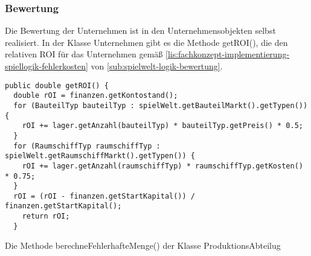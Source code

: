 \subsubsection{Bewertung}
\label{subsub:fachkonzept-implementierung-spiellogik-bewertung}

Die Bewertung der Unternehmen ist in den Unternehmensobjekten selbst realisiert. In der Klasse Unternehmen gibt es die Methode getROI(), die den relativen ROI für das Unternehmen gemäß \ref{lis:fachkonzept-implementierung-spiellogik-fehlerkosten} von \ref{sub:spielwelt-logik-bewertung}.

\begin{programm}[ht]
\begin{lstlisting}[breaklines=true]
public double getROI() {
  double rOI = finanzen.getKontostand();
  for (BauteilTyp bauteilTyp : spielWelt.getBauteilMarkt().getTypen()) {
    rOI += lager.getAnzahl(bauteilTyp) * bauteilTyp.getPreis() * 0.5;
  }
  for (RaumschiffTyp raumschiffTyp : spielWelt.getRaumschiffMarkt().getTypen()) {
    rOI += lager.getAnzahl(raumschiffTyp) * raumschiffTyp.getKosten() * 0.75;
  }
  rOI = (rOI - finanzen.getStartKapital()) / finanzen.getStartKapital();
    return rOI;
  }
\end{lstlisting}
\caption{Die Methode berechneFehlerhafteMenge() der Klasse ProduktionsAbteilug\label{lis:fachkonzept-implementierung-spiellogik-fehlerkosten}}
\end{programm}